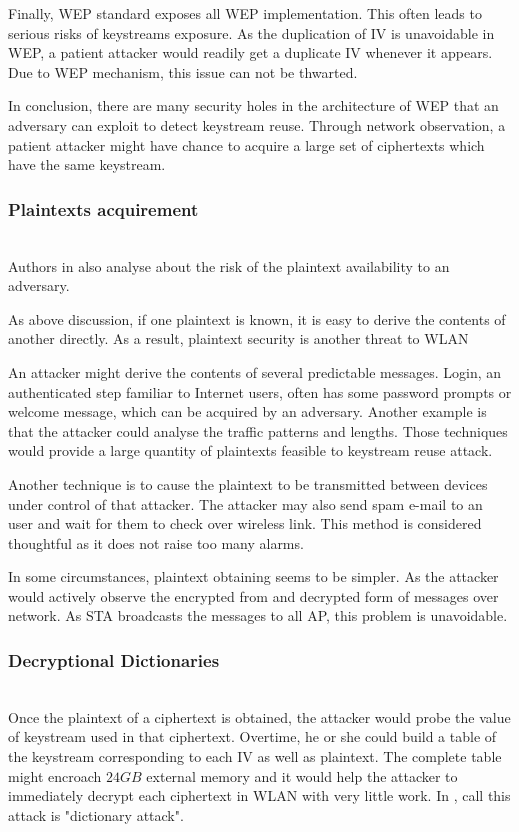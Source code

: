 Finally, \ac{WEP} standard exposes all \ac{WEP} implementation. This often leads to serious risks of keystreams exposure. As the duplication of \ac{IV} is unavoidable in \ac{WEP}, a patient attacker would readily get a duplicate \ac{IV} whenever it appears. Due to \ac{WEP} mechanism, this issue can not be thwarted.

In conclusion, there are many security holes in the architecture of \ac{WEP} that an adversary can exploit to detect keystream reuse. Through network observation, a patient attacker might have chance to acquire a large set of ciphertexts which have the same keystream.

\subsubsection{Plaintexts acquirement}~\\
Authors in \cite{borisov2001intercepting} also analyse about the risk of the plaintext availability to an adversary.

As above discussion, if one plaintext is known, it is easy to derive the contents of another directly. As a result, plaintext security is another threat to \ac{WLAN}

An attacker might derive the contents of several predictable messages. Login, an authenticated step familiar to Internet users, often has some password prompts or welcome message, which can be acquired by an adversary. Another example is that the attacker could analyse the traffic patterns and lengths. Those techniques would provide a large quantity of plaintexts feasible to keystream reuse attack.

Another technique is to cause the plaintext to be transmitted between devices under control of that attacker. The attacker may also send spam e-mail to an user and wait for them to check over wireless link. This method is considered thoughtful as it does not raise too many alarms.

In some circumstances, plaintext obtaining seems to be simpler. As the attacker would actively observe the encrypted from and decrypted form of messages over network. As \ac{STA} broadcasts the messages to all \ac{AP}, this problem is unavoidable.

\subsubsection{Decryptional Dictionaries}~\\
Once the plaintext of a ciphertext is obtained, the attacker would probe the value of keystream used in that ciphertext. Overtime, he or she could build a table of the keystream corresponding to each \ac{IV} as well as plaintext. The complete table might encroach $24GB$ external memory and it would help the attacker to immediately decrypt each ciphertext in \ac{WLAN} with very little work. In \cite{al2006ieee}, \citeauthor{al2006ieee} call this attack is "dictionary attack".


